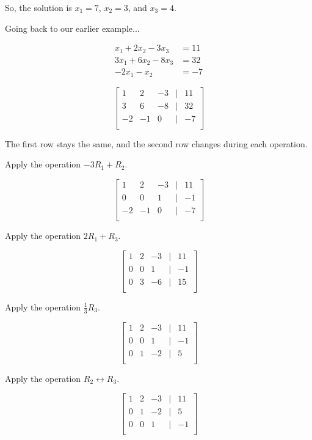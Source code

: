 \documentclass{article}
\begin{document}
So, the solution is \(x_1 = 7\), \(x_2 = 3\), and \(x_3 = 4\).

Going back to our earlier example...

\begin{align*}
    x_1 + 2x_2 - 3x_3 &= 11 \\
    3x_1 + 6x_2 - 8x_3 &= 32 \\
    -2x_1 - x_2 &= -7
\end{align*}

\[
\begin{bmatrix}
    1 & 2 & -3 & | & 11 \\
    3 & 6 & -8 & | & 32 \\
    -2 & -1 & 0 & | & -7 \\
\end{bmatrix}
\] 

The first row stays the same, and the second row changes during each operation.

Apply the operation \( -3R_1 + R_2 \). 


\[
\begin{bmatrix}
    1 & 2 & -3 & | & 11 \\
    0 & 0 & 1 & | & -1 \\
    -2 & -1 & 0 & | & -7 \\
\end{bmatrix}
\] 

Apply the operation \( 2R_1 + R_3 \).

\[
\begin{bmatrix}
    1 & 2 & -3 & | & 11 \\
    0 & 0 & 1 & | & -1 \\
    0 & 3 & -6 & | & 15 \\
\end{bmatrix}
\] 

Apply the operation \(\frac{1}{3}R_3\).

\[
\begin{bmatrix}
    1 & 2 & -3 & | & 11 \\
    0 & 0 & 1 & | & -1 \\
    0 & 1 & -2 & | & 5 \\
\end{bmatrix}
\] 

Apply the operation \(R_2 \leftrightarrow R_3\).

\[
\begin{bmatrix}
    1 & 2 & -3 & | & 11 \\
    0 & 1 & -2 & | & 5 \\
    0 & 0 & 1 & | & -1 \\
\end{bmatrix}
\] 
\end{document}
